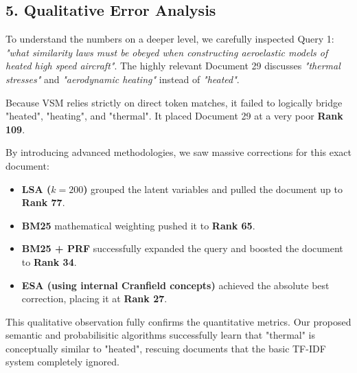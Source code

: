 \documentclass{svproc}
\begin{document}
\subsection*{5. Qualitative Error Analysis}
To understand the numbers on a deeper level, we carefully inspected Query 1: \textit{"what similarity laws must be obeyed when constructing aeroelastic models of heated high speed aircraft"}. 
The highly relevant Document 29 discusses \textit{"thermal stresses"} and \textit{"aerodynamic heating"} instead of \textit{"heated"}. 

Because VSM relies strictly on direct token matches, it failed to logically bridge "heated", "heating", and "thermal". It placed Document 29 at a very poor \textbf{Rank 109}. 

By introducing advanced methodologies, we saw massive corrections for this exact document:
\begin{itemize}
    \item \textbf{LSA ($k=200$)} grouped the latent variables and pulled the document up to \textbf{Rank 77}.
    \item \textbf{BM25} mathematical weighting pushed it to \textbf{Rank 65}.
    \item \textbf{BM25 + PRF} successfully expanded the query and boosted the document to \textbf{Rank 34}.
    \item \textbf{ESA (using internal Cranfield concepts)} achieved the absolute best correction, placing it at \textbf{Rank 27}.
\end{itemize}

This qualitative observation fully confirms the quantitative metrics. Our proposed semantic and probabilisitic algorithms successfully learn that "thermal" is conceptually similar to "heated", rescuing documents that the basic TF-IDF system completely ignored.
\end{document}
